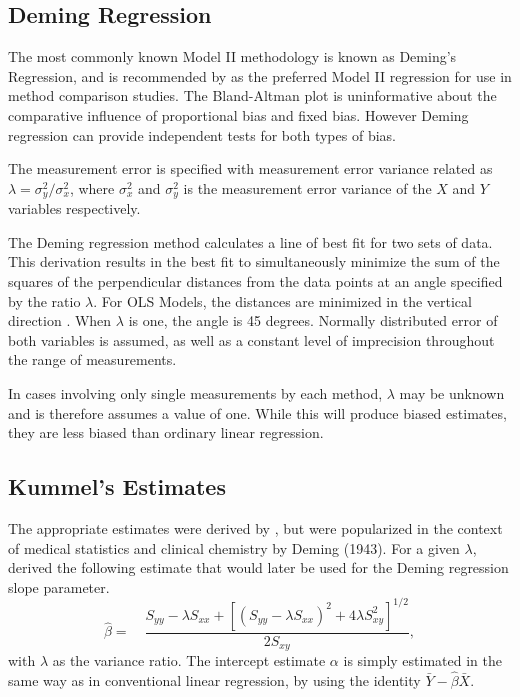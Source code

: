 \documentclass[12pt, a4paper]{report}
\theoremstyle{plain}
\theoremstyle{definition}
\theoremstyle{remark}
\begin{document}
\subsection{Deming Regression}
The most commonly known Model II methodology is known as Deming's Regression, and is recommended by \citet*{CornCoch} as the preferred Model II regression for use in method comparison studies. The Bland-Altman plot is uninformative about the comparative influence of proportional bias and fixed bias. However Deming regression can provide independent tests for both types of bias.

The measurement error is specified with measurement error variance related as 
$\displaystyle{\lambda =\sigma^2_y/\sigma^2_x}$, where $\sigma^2_x$ and $\sigma^2_y$ is the measurement error variance of the $X$ and $Y$ variables respectively.

The Deming regression method calculates a line of best fit for two sets of data. This derivation results in the best fit to simultaneously minimize the sum of the squares of the perpendicular distances from the data points at an angle specified by the ratio $\lambda$. For OLS Models, the distances are minimized in the vertical direction \citep{linnet99}. When $\lambda$ is one, the angle is 45 degrees. Normally distributed error of both variables is assumed, as well as a constant level of imprecision throughout the range of measurements.

In cases involving only single measurements by each method, $\lambda$ may be unknown and is therefore assumes a value of one. While this will produce biased estimates, they are less biased than ordinary linear regression.


\subsection{Kummel's Estimates}

The appropriate estimates were derived by \citet{Kummel}, but were popularized in the context of medical statistics and clinical chemistry by Deming (1943).
For a given $\lambda$, \citet{Kummel} derived the following estimate that would later be used for the Deming regression slope
parameter. 
\begin{equation}
\hat{\beta} =\quad \frac{S_{yy} - \lambda S_{xx}+[(S_{yy} -
	\lambda S_{xx})^{2}+ 4\lambda S^{2}_{xy}]^{1/2}}{2S_{xy}},
\end{equation}
with $\lambda$ as the variance ratio. The intercept estimate $\alpha$ is simply estimated in the same way as in conventional linear
regression, by using the identity $\bar{Y}-\hat{\beta}\bar{X}$.  
\end{document}
